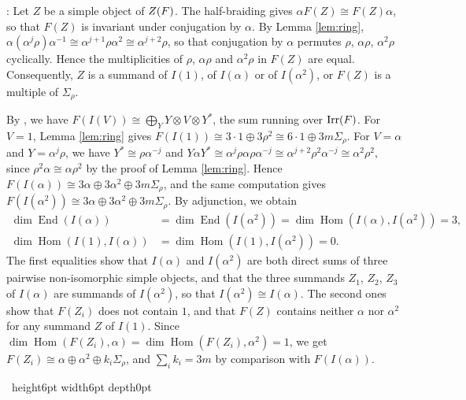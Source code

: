 \documentclass[leqno]{article}
\let\cal\relax
\newcommand{\cal}{\mathcal}
\newcommand{\qed}{\hfill \vrule height6pt  width6pt depth0pt}
\newcommand{\ot}{\otimes}
\DeclareMathOperator{\Irr}{Irr} %
\newenvironment{proof}[1][]{\noindent {\it Proof #1} : }{\hbox{~}\qed
\smallskip
}
\numberwithin{equation}{section}
\begin{document}
\begin{proof}
Let $Z$ be a simple object of $Z(\cal F)$. The half-braiding gives $\alpha F(Z) \cong F(Z)\alpha$, so that $F(Z)$ is invariant under conjugation by $\alpha$. By Lemma \ref{lem:ring}, $\alpha(\alpha^j\rho)\alpha^{-1} \cong \alpha^{j+1}\rho\alpha^2 \cong \alpha^{j+2}\rho$, so that conjugation by $\alpha$ permutes $\rho$, $\alpha\rho$, $\alpha^2\rho$ cyclically. Hence the multiplicities of $\rho$, $\alpha\rho$ and $\alpha^2\rho$ in $F(Z)$ are equal. Consequently, $Z$ is a summand of $I(1)$, of $I(\alpha)$ or of $I(\alpha^2)$, or $F(Z)$ is a multiple of $\Sigma_\rho$.

By \cite[Proposition 5.4 p.~21]{ENO05}, we have $F(I(V)) \cong \bigoplus_{Y} Y \ot V \ot Y^*$, the sum running over $\Irr(\cal F)$. For $V = 1$, Lemma \ref{lem:ring} gives $F(I(1)) \cong 3\cdot 1 \oplus 3\rho^2 \cong 6\cdot 1 \oplus 3m\Sigma_\rho$. For $V = \alpha$ and $Y = \alpha^j\rho$, we have $Y^* \cong \rho\alpha^{-j}$ and $Y\alpha Y^* \cong \alpha^j\rho\alpha\rho\alpha^{-j} \cong \alpha^{j+2}\rho^2\alpha^{-j} \cong \alpha^2\rho^2$, since $\rho^2\alpha \cong \alpha\rho^2$ by the proof of Lemma \ref{lem:ring}. Hence $F(I(\alpha)) \cong 3\alpha \oplus 3\alpha^2 \oplus 3m\Sigma_\rho$, and the same computation gives $F(I(\alpha^2)) \cong 3\alpha \oplus 3\alpha^2 \oplus 3m\Sigma_\rho$. By adjunction, we obtain
\begin{align*}
\dim \operatorname{End}(I(\alpha)) &= \dim \operatorname{End}(I(\alpha^2)) = \dim\operatorname{Hom}(I(\alpha),I(\alpha^2)) = 3,\\
\dim\operatorname{Hom}(I(1),I(\alpha)) &= \dim\operatorname{Hom}(I(1),I(\alpha^2)) = 0.
\end{align*}
The first equalities show that $I(\alpha)$ and $I(\alpha^2)$ are both direct sums of three pairwise non-isomorphic simple objects, and that the three summands $Z_1$, $Z_2$, $Z_3$ of $I(\alpha)$ are summands of $I(\alpha^2)$, so that $I(\alpha^2) \cong I(\alpha)$. The second ones show that $F(Z_i)$ does not contain $1$, and that $F(Z)$ contains neither $\alpha$ nor $\alpha^2$ for any summand $Z$ of $I(1)$. Since $\dim\operatorname{Hom}(F(Z_i),\alpha) = \dim\operatorname{Hom}(F(Z_i),\alpha^2) = 1$, we get $F(Z_i) \cong \alpha \oplus \alpha^2 \oplus k_i\Sigma_\rho$, and $\sum_i k_i = 3m$ by comparison with $F(I(\alpha))$.


\end{proof}
\end{document}

